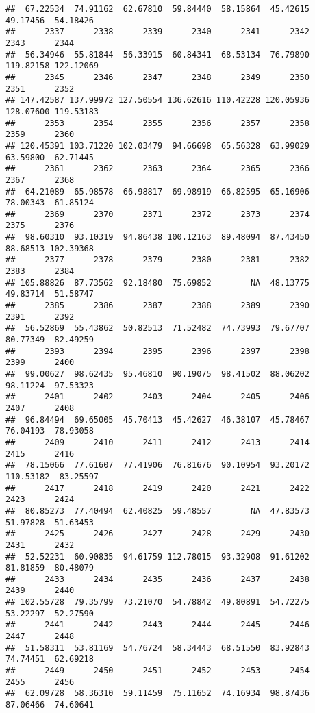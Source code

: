 \documentclass[
]{article}
\begin{document}
\begin{verbatim}
##  67.22534  74.91162  62.67810  59.84440  58.15864  45.42615  49.17456  54.18426 
##      2337      2338      2339      2340      2341      2342      2343      2344 
##  56.34946  55.81844  56.33915  60.84341  68.53134  76.79890 119.82158 122.12069 
##      2345      2346      2347      2348      2349      2350      2351      2352 
## 147.42587 137.99972 127.50554 136.62616 110.42228 120.05936 128.07600 119.53183 
##      2353      2354      2355      2356      2357      2358      2359      2360 
## 120.45391 103.71220 102.03479  94.66698  65.56328  63.99029  63.59800  62.71445 
##      2361      2362      2363      2364      2365      2366      2367      2368 
##  64.21089  65.98578  66.98817  69.98919  66.82595  65.16906  78.00343  61.85124 
##      2369      2370      2371      2372      2373      2374      2375      2376 
##  98.60310  93.10319  94.86438 100.12163  89.48094  87.43450  88.68513 102.39368 
##      2377      2378      2379      2380      2381      2382      2383      2384 
## 105.88826  87.73562  92.18480  75.69852        NA  48.13775  49.83714  51.58747 
##      2385      2386      2387      2388      2389      2390      2391      2392 
##  56.52869  55.43862  50.82513  71.52482  74.73993  79.67707  80.77349  82.49259 
##      2393      2394      2395      2396      2397      2398      2399      2400 
##  99.00627  98.62435  95.46810  90.19075  98.41502  88.06202  98.11224  97.53323 
##      2401      2402      2403      2404      2405      2406      2407      2408 
##  96.84494  69.65005  45.70413  45.42627  46.38107  45.78467  76.04193  78.93058 
##      2409      2410      2411      2412      2413      2414      2415      2416 
##  78.15066  77.61607  77.41906  76.81676  90.10954  93.20172 110.53182  83.25597 
##      2417      2418      2419      2420      2421      2422      2423      2424 
##  80.85273  77.40494  62.40825  59.48557        NA  47.83573  51.97828  51.63453 
##      2425      2426      2427      2428      2429      2430      2431      2432 
##  52.52231  60.90835  94.61759 112.78015  93.32908  91.61202  81.81859  80.48079 
##      2433      2434      2435      2436      2437      2438      2439      2440 
## 102.55728  79.35799  73.21070  54.78842  49.80891  54.72275  53.22297  52.27590 
##      2441      2442      2443      2444      2445      2446      2447      2448 
##  51.58311  53.81169  54.76724  58.34443  68.51550  83.92843  74.74451  62.69218 
##      2449      2450      2451      2452      2453      2454      2455      2456 
##  62.09728  58.36310  59.11459  75.11652  74.16934  98.87436  87.06466  74.60641 

\end{verbatim}
\end{document}
